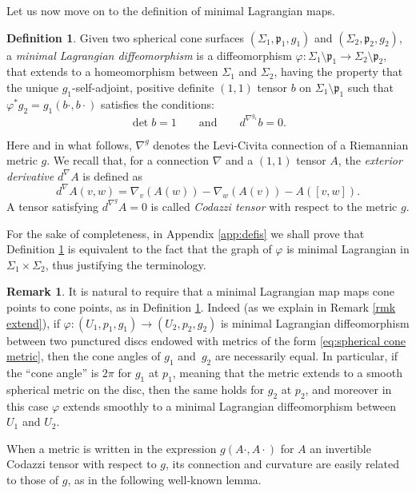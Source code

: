 \documentclass[JEP,XML,SOM,Unicode,NoEqCountersInSection,published]{cedram}
\theoremstyle{definition}
\newtheorem{defi}[cor]{Definition}
\newtheorem{remark}[cor]{Remark}
\begin{document}
Let us now move on to the definition of minimal Lagrangian maps.

\begin{defi} \label{defi min lag}
Given two spherical cone surfaces $(\Sigma_1,\mathfrak p_1,g_1)$ and $(\Sigma_2,\mathfrak p_2,g_2)$, a \emph{minimal Lagrangian diffeomorphism} is a diffeomorphism $\varphi:\Sigma_1\setminus\mathfrak p_1\to\Sigma_2\setminus\mathfrak p_2$, that extends to a homeomorphism between $\Sigma_1$ and $\Sigma_2$, having the property that the unique $g_1$-self-adjoint, positive definite $(1,1)$ tensor $b$ on $\Sigma_1\setminus \mathfrak p_1$ such that $\varphi^*g_2=g_1(b\cdot,b\cdot)$ satisfies the conditions:
\begin{equation}\label{eq:defi min lag}
\det b=1\qquad\text{and}\qquad d^{\nabla^{g_1}}\!b=0.
\end{equation}
\end{defi}

Here and in what follows, $\nabla^g$ denotes the Levi-Civita connection of a Riemannian metric $g$. We recall that, for a connection $\nabla$ and a $(1,1)$ tensor $A$, the \emph{exterior derivative} $d^\nabla \!\!A$ is defined as
\[
d^\nabla \!\!A(v,w)=\nabla_v(A(w))-\nabla_w(A(v))-A([v,w]).
\]
A tensor satisfying $d^{\nabla^g}\!\!A=0$ is called \emph{Codazzi tensor} with respect to the metric $g$.

For the sake of completeness, in Appendix \ref{app:defis} we shall prove that Definition \ref{defi min lag} is equivalent to the fact that the graph of $\varphi$ is minimal Lagrangian in $\Sigma_1\times\Sigma_2$, thus justifying the terminology.

\begin{remark}
It is natural to require that a minimal Lagrangian map maps cone points to cone points, as in Definition \ref{defi min lag}. Indeed (as we explain in Remark \ref{rmk extend}), if $\varphi:(U_1,p_1,g_1)\to (U_2,p_2,g_2)$ is minimal Lagrangian diffeomorphism between two punctured discs endowed with metrics of the form \eqref{eq:spherical cone metric}, then the cone angles of $g_1$ and~$g_2$ are necessarily equal. In particular, if the ``cone angle'' is $2\pi$ for $g_1$ at $p_1$, meaning that the metric extends to a smooth spherical metric on the disc, then the same holds for $g_2$ at $p_2$, and moreover in this case $\varphi$ extends smoothly to a minimal Lagrangian diffeomorphism between $U_1$ and $U_2$.
\end{remark}

When a metric is written in the expression $g(A\cdot,A\cdot)$ for $A$ an invertible Codazzi tensor with respect to $g$, its connection and curvature are easily related to those of $g$, as in the following well-known lemma.
\end{document}

